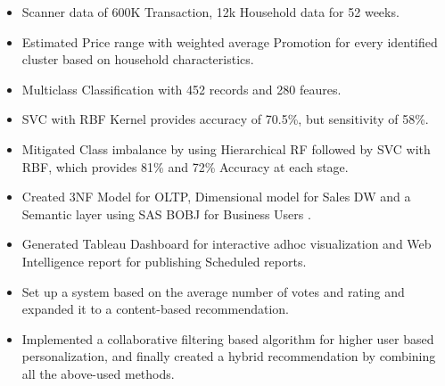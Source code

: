 \documentclass[10pt,a4paper]{altacv}
\begin{document}

\nocite{*}


\begin{itemize}
\item Scanner data of 600K Transaction, 12k Household data for 52 weeks.
\item Estimated Price range with weighted average Promotion for every identified cluster based on household characteristics.
\end{itemize}

\begin{itemize}
\item Multiclass Classification with 452 records and 280 feaures.
\item SVC with RBF Kernel provides accuracy of 70.5\%, but sensitivity of 58\%.
\item Mitigated Class imbalance by using Hierarchical RF followed by SVC with RBF, which provides 81\% and 72\% Accuracy at each stage.
\end{itemize}

\begin{itemize}
\item Created 3NF Model for OLTP, Dimensional model for Sales DW and a Semantic layer using SAS BOBJ for Business Users .
\item Generated Tableau Dashboard for interactive adhoc visualization and Web Intelligence report for publishing Scheduled reports.
\end{itemize}

\begin{itemize}
\item Set up a system based on the average number of votes and rating and expanded it to a content-based recommendation.
\item Implemented a collaborative filtering based algorithm for higher user based personalization, and finally created a hybrid recommendation by combining all the above-used methods.

\end{itemize}

\clearpage
\end{document}
